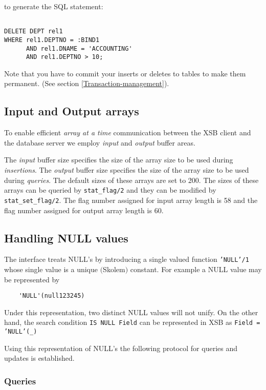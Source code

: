 to generate the SQL statement:
\begin{verbatim}

DELETE DEPT rel1 
WHERE rel1.DEPTNO = :BIND1 
      AND rel1.DNAME = 'ACCOUNTING'
      AND rel1.DEPTNO > 10;
\end{verbatim}


Note that you have to commit your inserts or deletes to tables to make
them permanent.  (See section \ref{Transaction-management}).

\subsection{Input and Output arrays}\label{Array-sizes}

To enable efficient {\it array at a time} communication between the XSB client
and the database server we employ {\it input} and  {\it output} buffer areas.

The {\it input} buffer size specifies the size of the array size to be used
during {\it insertions}. The {\it output} buffer size specifies the size of the
array size to be used during {\it queries}. The default sizes of these arrays
are set to 200. The sizes of these arrays can be queried by {\tt stat\_flag/2}
and they can be modified by {\tt stat\_set\_flag/2}. The flag number assigned
for input array length is 58 and  the flag number assigned for output array 
length is 60.

\subsection{Handling NULL values}\label{NULL-values}


The interface treats NULL's by introducing a single valued function
{\tt 'NULL'/1} whose single value is a unique $($Skolem$)$ constant.
For example a NULL value may be represented by 
\begin{verbatim}
	'NULL'(null123245) 
\end{verbatim} 
Under this representation, two distinct NULL values will not unify.
On the other hand, the search condition {\tt IS NULL Field} can be
represented in XSB as {\tt Field = 'NULL'(\_)}

Using this representation of NULL's the following protocol for queries
and updates is established.

\subsubsection{Queries}

